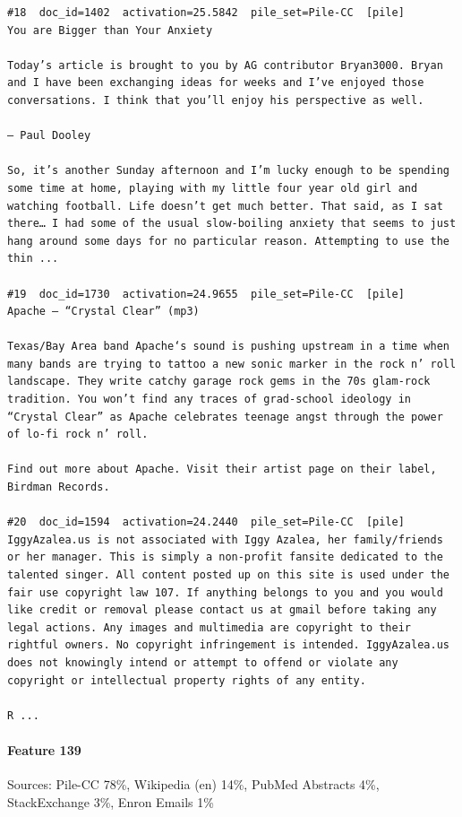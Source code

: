 \begin{verbatim}
#18  doc_id=1402  activation=25.5842  pile_set=Pile-CC  [pile]
You are Bigger than Your Anxiety

Today’s article is brought to you by AG contributor Bryan3000. Bryan and I have been exchanging ideas for weeks and I’ve enjoyed those conversations. I think that you’ll enjoy his perspective as well.

— Paul Dooley

So, it’s another Sunday afternoon and I’m lucky enough to be spending some time at home, playing with my little four year old girl and watching football. Life doesn’t get much better. That said, as I sat there… I had some of the usual slow-boiling anxiety that seems to just hang around some days for no particular reason. Attempting to use the thin ...

#19  doc_id=1730  activation=24.9655  pile_set=Pile-CC  [pile]
Apache – “Crystal Clear” (mp3)

Texas/Bay Area band Apache‘s sound is pushing upstream in a time when many bands are trying to tattoo a new sonic marker in the rock n’ roll landscape. They write catchy garage rock gems in the 70s glam-rock tradition. You won’t find any traces of grad-school ideology in “Crystal Clear” as Apache celebrates teenage angst through the power of lo-fi rock n’ roll.

Find out more about Apache. Visit their artist page on their label, Birdman Records.

#20  doc_id=1594  activation=24.2440  pile_set=Pile-CC  [pile]
IggyAzalea.us is not associated with Iggy Azalea, her family/friends or her manager. This is simply a non-profit fansite dedicated to the talented singer. All content posted up on this site is used under the fair use copyright law 107. If anything belongs to you and you would like credit or removal please contact us at gmail before taking any legal actions. Any images and multimedia are copyright to their rightful owners. No copyright infringement is intended. IggyAzalea.us does not knowingly intend or attempt to offend or violate any copyright or intellectual property rights of any entity.

R ...

\end{verbatim}

\paragraph*{Feature 139} Sources: Pile-CC 78\%, Wikipedia (en) 14\%, PubMed Abstracts 4\%, StackExchange 3\%, Enron Emails 1\%

